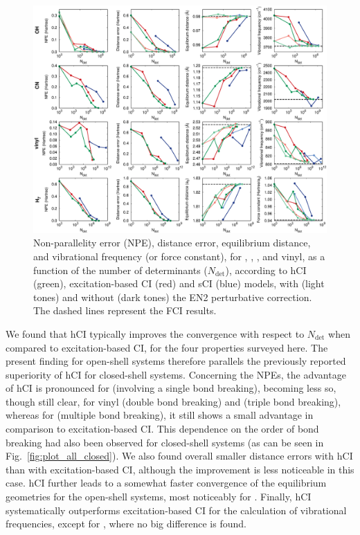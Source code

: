 \documentclass[aip,jcp,reprint,noshowkeys,superscriptaddress]{revtex4-1}
\newcommand{\Ndet}{N_\text{det}}
\begin{document}
\begin{figure}%
\includegraphics[width=1.0\linewidth]{plot_all}
\caption{
Non-parallelity error (NPE), distance error, equilibrium distance, and vibrational frequency (or force constant), for , , , and vinyl,
as a function of the number of determinants ($\Ndet$), according to hCI (green), excitation-based CI (red) and sCI (blue) models,
with (light tones) and without (dark tones) the EN2 perturbative correction.
The dashed lines represent the FCI results.}
\label{fig:plot_all}
\end{figure}

We found that hCI typically improves the convergence with respect to $\Ndet$ when compared to excitation-based CI, for the four properties surveyed here.
The present finding for open-shell systems therefore parallels the previously reported superiority of hCI for closed-shell systems. \cite{Kossoski_2022}
Concerning the NPEs, the advantage of hCI is pronounced for  (involving a single bond breaking), 
becoming less so, though still clear, for vinyl (double bond breaking) and  (triple bond breaking),
whereas for  (multiple bond breaking), it still shows a small advantage in comparison to excitation-based CI.
This dependence on the order of bond breaking had also been observed for closed-shell systems \cite{Kossoski_2022} (as can be seen in Fig.~\ref{fig:plot_all_closed}).
We also found overall smaller distance errors with hCI than with excitation-based CI, although the improvement is less noticeable in this case.
hCI further leads to a somewhat faster convergence of the equilibrium geometries for the open-shell systems, most noticeably for .
Finally, hCI systematically outperforms excitation-based CI for the calculation of vibrational frequencies, except for , where no big difference is found.
\end{document}
